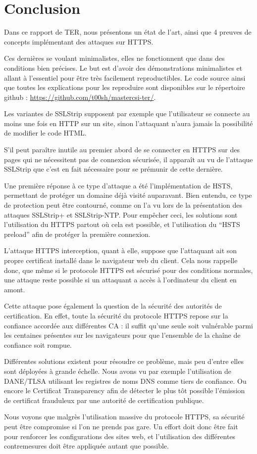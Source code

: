 \chapter*{Conclusion}


Dans ce rapport de TER, nous présentons un état de l'art, ainsi que 4 preuves de concepts implémentant des attaques sur HTTPS. 

Ces dernières se voulant minimalistes, elles ne fonctionnent que dans des conditions bien précises. Le but est d'avoir des démonstrations minimalistes et allant à l'essentiel pour être très facilement reproductibles. Le code source ainsi que toutes les explications pour les reproduire sont disponibles sur le répertoire github : \url{https://github.com/t00sh/mastercsi-ter/}.

Les variantes de SSLStrip supposent par exemple que l'utilisateur se connecte au moins une fois en HTTP sur un site, sinon l'attaquant n'aura jamais la possibilité de modifier le code HTML.

S'il peut paraître inutile au premier abord de se connecter en HTTPS sur des pages qui ne nécessitent pas de connexion sécurisée, il apparaît au vu de l'attaque SSLStrip que c'est en fait nécessaire pour se prémunir de cette dernière.

Une première réponse à ce type d'attaque a été l'implémentation de HSTS, permettant de protéger un domaine déjà visité auparavant. Bien entendu, ce type de protection peut être contourné, comme on l'a vu lors de la présentation des attaques SSLStrip+ et SSLStrip-NTP. Pour empêcher ceci, les solutions sont l'utilisation du HTTPS partout où cela est possible, et l'utilisation du ``HSTS preload'' afin de protéger la première connexion.

L'attaque HTTPS interception, quant à elle, suppose que l'attaquant ait son propre certificat installé dans le navigateur web du client. Cela nous rappelle donc, que même si le protocole HTTPS est sécurisé pour des conditions normales, une attaque reste possible si un attaquant a accès à l'ordinateur du client en amont.

Cette attaque pose également la question de la sécurité des autorités de certification. En effet, toute la sécurité du protocole HTTPS repose sur la confiance accordée aux différentes CA : il suffit qu'une seule soit vulnérable parmi les centaines présentes sur les navigateurs pour que l'ensemble de la chaîne de confiance soit rompue.

Différentes solutions existent pour résoudre ce problème, mais peu d'entre elles sont déployées à grande échelle. Nous avons vu par exemple l'utilisation de DANE/TLSA utilisant les registres de noms DNS comme tiers de confiance. Ou encore le Certificat Transparency afin de détecter le plus tôt possible l'émission de certificat frauduleux par une autorité de certification publique.

Nous voyons que malgrès l'utilisation massive du protocole HTTPS, sa sécurité peut être compromise si l'on ne prends pas gare. Un effort doit donc être fait pour renforcer les configurations des sites web, et l'utilisation des différentes contremesures doit être appliquée autant que possible.
